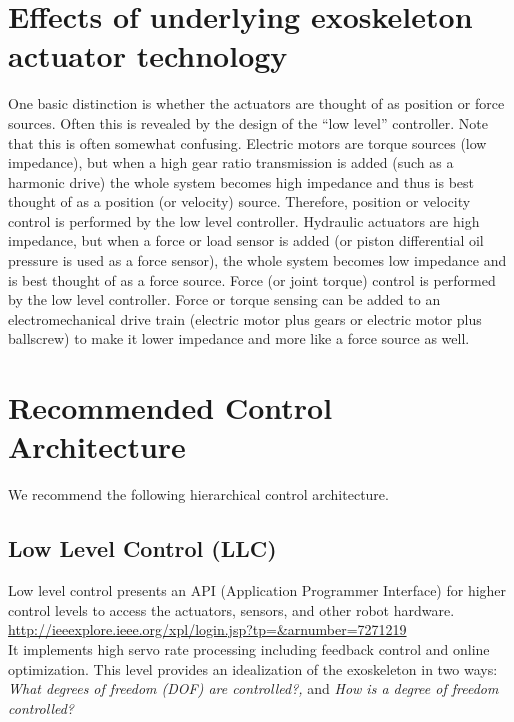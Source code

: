 \documentclass[letterpaper,12pt,fullpage]{article}
\begin{document}




\section{Effects of underlying exoskeleton actuator technology}

One basic distinction is whether the actuators are thought of as position
or force sources. Often this is revealed by the design of the ``low level''
controller. Note that this is often somewhat confusing. Electric motors
are torque sources (low impedance), but when a high gear ratio transmission
is added (such as a harmonic drive) the whole system becomes high impedance
and thus is best thought of as a position (or velocity) source. Therefore,
position or velocity 
control is performed by the low level controller. Hydraulic actuators
are high impedance, but when a force or load sensor is added (or piston differential
oil pressure is used as a force sensor), the whole system becomes low impedance
and is best thought of as a force source. Force (or joint torque) control is
performed by the low level controller. Force or torque sensing can be added to an
electromechanical drive train (electric motor plus gears or electric
motor plus ballscrew)
to make it lower impedance and more like a force source as well.

\section{Recommended Control Architecture}
\label{sec:architecture}

We recommend the following hierarchical control architecture.

\subsection{Low Level Control (LLC)}

Low level control presents an API (Application Programmer Interface)
for higher control levels
to access the actuators, sensors, and other robot hardware.\\
\url{http://ieeexplore.ieee.org/xpl/login.jsp?tp=&arnumber=7271219}\\
It implements high servo rate processing including feedback control and online
optimization.
This level provides an idealization of the exoskeleton in two ways: 
{\it What degrees of freedom (DOF) are controlled?,} and 
{\it How is a degree of freedom controlled?}
\end{document}
